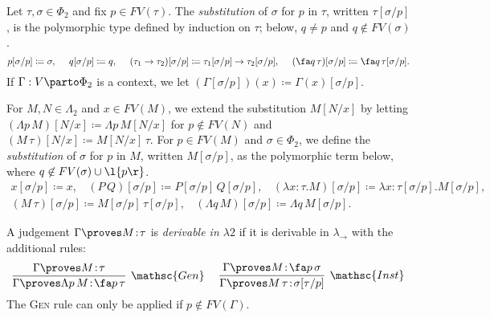 \documentclass[reqno]{amsart}
\begin{document}
    \begin{definition}
        Let $\tau,\sigma\in\Phi_2$ and fix $p\in FV(\tau)$. The \textit{substitution} of $\sigma$ for $p$ in $\tau$, written $\tau[\sigma/p]$, is the polymorphic type defined by induction on $\tau$; below, $q\neq p$ and $q\not\in FV(\sigma)$.
        \begin{equation*}
            p[\sigma/p]\coloneqq\sigma,\ \ \ \ q[\sigma/p]\coloneqq q,\ \ \ \ (\tau_1\rightarrow\tau_2)[\sigma/p]\coloneqq\tau_1[\sigma/p]\rightarrow\tau_2[\sigma/p],\ \ \ \ (\fa q\,\tau)[\sigma/p]\coloneqq\fa q\,\tau[\sigma/p].
        \end{equation*}
        If $\Gamma:V\parto\Phi_2$ is a context, we let $(\Gamma[\sigma/p])(x)\coloneqq\Gamma(x)[\sigma/p]$.
    \end{definition}

    \begin{definition}
        For $M,N\in\Lambda_2$ and $x\in FV(M)$, we extend the substitution $M[N/x]$ by letting $(\Lambda p\,M)[N/x]\coloneqq\Lambda p\,M[N/x]$ for $p\not\in FV(N)$ and $(M\,\tau)[N/x]\coloneqq M[N/x]\,\tau$. For $p\in FV(M)$ and $\sigma\in\Phi_2$, we define the \textit{substitution} of $\sigma$ for $p$ in $M$, written $M[\sigma/p]$, as the polymorphic term below, where $q\not\in FV(\sigma)\cup\l\{p\r\}$.
        \begin{equation*}
            \begin{gathered}
                x[\sigma/p]\coloneqq x,\ \ \ \ (P\,Q)[\sigma/p]\coloneqq P[\sigma/p]\,Q[\sigma/p],\ \ \ \ (\lambda x\!:\!\tau.M)[\sigma/p]\coloneqq\lambda x\!:\!{\tau[\sigma/p]}.M[\sigma/p],\\
                (M\,\tau)[\sigma/p]\coloneqq M[\sigma/p]\,\tau[\sigma/p],\ \ \ \ (\Lambda q\,M)[\sigma/p]\coloneqq\Lambda q\,M[\sigma/p].
            \end{gathered}
        \end{equation*}
    \end{definition}

    \begin{definition}
        A judgement $\Gamma\proves M\!:\!\tau$ is \textit{derivable in $\lambda2$} if it is derivable in $\lambda_\rightarrow$ with the additional rules:
        \begin{equation*}
            \infer[\mathsc{Gen}]{\Gamma\proves\Lambda p\,M\!:\!\fa p\,\tau}{\Gamma\proves M\!:\!\tau}\ \ \ \ 
            \infer[\mathsc{Inst}]{\Gamma\proves M\,\tau\!:\!\sigma[\tau/p]}{\Gamma\proves M\!:\!\fa p\,\sigma}
        \end{equation*}
        The \textsc{Gen} rule can only be applied if $p\not\in FV(\Gamma)$.
    \end{definition}
\end{document}
